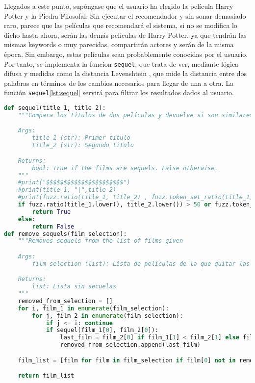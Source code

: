 Llegados a este punto, supóngase que el usuario ha elegido la película Harry Potter y la Piedra Filosofal. Sin ejecutar el recomendador y sin sonar demasiado raro, parece que las películas que recomendará el sistema, si no se modifica lo dicho hasta ahora, serán las demás películas de Harry Potter, ya que tendrán las mismas keywords o muy parecidas, compartirán actores y serán de la misma época. Sin embargo, estas películas sean probablemente conocidas por el usuario. Por tanto, se implementa la funcion \texttt{sequel}, que trata de ver, mediante lógica difusa y medidas como la distancia Levenshtein \cite{levenshtein}, que mide la distancia entre dos palabras en términos de los cambios necesarios para llegar de una a otra. La función \texttt{sequel}\ref{lst:sequel} servirá para filtrar los resultados dados al usuario.
\begin{lstlisting}[language=Python, label={lst:sequel},caption=Determinación de si dos películas son o no secuelas y eliminarlas.]
def sequel(title_1, title_2):   
    """Compara los títulos de dos películas y devuelve si son similares o no

    Args:
        title_1 (str): Primer título
        title_2 (str): Segundo título

    Returns:
        bool: True if the films are sequels. False otherwise.
    """
    #print("$$$$$$$$$$$$$$$$$$$$$$")
    #print(title_1, "|",title_2)
    #print(fuzz.ratio(title_1, title_2) , fuzz.token_set_ratio(title_1, title_2))
    if fuzz.ratio(title_1.lower(), title_2.lower()) > 50 or fuzz.token_set_ratio(title_1.lower(), title_2.lower()) > 60:
        return True
    else:
        return False
def remove_sequels(film_selection):
    """Removes sequels from the list of films given

    Args:
        film_selection (list): Lista de películas de la que quitar las secuelas

    Returns:
        list: Lista sin secuelas
    """ 
    removed_from_selection = []
    for i, film_1 in enumerate(film_selection):
        for j, film_2 in enumerate(film_selection):
            if j <= i: continue 
            if sequel(film_1[0], film_2[0]): 
                last_film = film_2[0] if film_1[1] < film_2[1] else film_1[0]
                removed_from_selection.append(last_film)

    film_list = [film for film in film_selection if film[0] not in removed_from_selection]

    return film_list  
\end{lstlisting}

